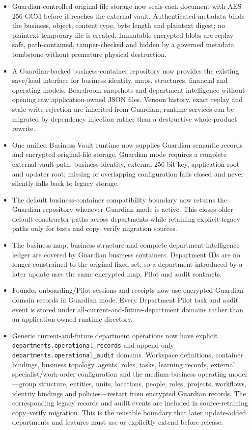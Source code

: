\documentclass[11pt]{article}
\begin{document}
\begin{itemize}
  \item Guardian-controlled original-file storage now seals each document with AES-256-GCM before it reaches the external vault. Authenticated metadata binds the business, object, content type, byte length and plaintext digest; no plaintext temporary file is created. Immutable encrypted blobs are replay-safe, path-contained, tamper-checked and hidden by a governed metadata tombstone without premature physical destruction.
  \item A Guardian-backed business-container repository now provides the existing save/load interface for business identity, maps, structures, financial and operating models, Boardroom snapshots and department intelligence without opening raw application-owned JSON files. Version history, exact replay and stale-write rejection are inherited from Guardian; runtime services can be migrated by dependency injection rather than a destructive whole-product rewrite.
  \item One unified Business Vault runtime now supplies Guardian semantic records and encrypted original-file storage. Guardian mode requires a complete external-vault path, business identity, external 256-bit key, application root and updater root; missing or overlapping configuration fails closed and never silently falls back to legacy storage.
  \item The default business-container compatibility boundary now returns the Guardian repository whenever Guardian mode is active. This closes older default-constructor paths across departments while retaining explicit legacy paths only for tests and copy--verify migration sources.
  \item The business map, business structure and complete department-intelligence ledger are covered by Guardian business containers. Department IDs are no longer constrained to the original fixed set, so a department introduced by a later update uses the same encrypted map, Pilot and audit contracts.
  \item Founder onboarding/Pilot sessions and receipts now use encrypted Guardian domain records in Guardian mode. Every Department Pilot task and audit event is stored under all-current-and-future-department domains rather than an application-owned runtime directory.
  \item Generic current-and-future department operations now have explicit \texttt{departments.operational\_records} and append-only \texttt{departments.operational\_audit} domains. Workspace definitions, container bindings, business topology, agents, roles, tasks, learning records, external specialist/work-order configuration and the medium-business operating model---group structure, entities, units, locations, people, roles, projects, workflows, identity bindings and policies---restart from encrypted Guardian records. The corresponding legacy records and audit events are included in source-retaining copy--verify migration. This is the reusable boundary that later update-added departments and features must use or explicitly extend before release.

\end{itemize}
\end{document}
